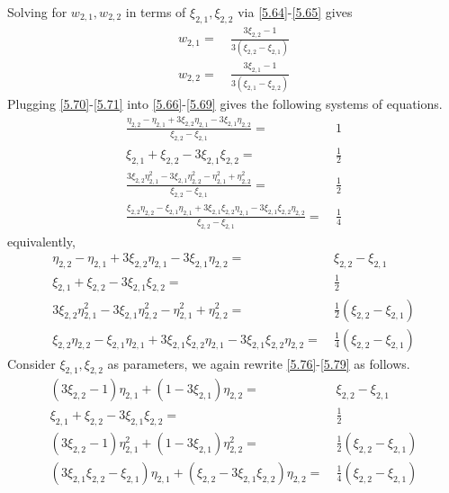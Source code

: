 \documentclass[a4paper]{article}
\numberwithin{equation}{section}
\begin{document}
Solving for $w_{2,1},w_{2,2}$ in terms of $\xi _{2,1},\xi _{2,2}$ via \eqref{5.64}-\eqref{5.65} gives
\begin{align}
\label{5.70}
{w_{2,1}} =&\ \frac{{3{\xi _{2,2}} - 1}}{{3\left( {{\xi _{2,2}} - {\xi _{2,1}}} \right)}}\\
{w_{2,2}} =&\ \frac{{3{\xi _{2,1}} - 1}}{{3\left( {{\xi _{2,1}} - {\xi _{2,2}}} \right)}} \label{5.71}
\end{align}
Plugging \eqref{5.70}-\eqref{5.71} into \eqref{5.66}-\eqref{5.69} gives the following systems of equations.
\begin{align}
\frac{{{\eta _{2,2}} - {\eta _{2,1}} + 3{\xi _{2,2}}{\eta _{2,1}} - 3{\xi _{2,1}}{\eta _{2,2}}}}{{{\xi _{2,2}} - {\xi _{2,1}}}} =&\ 1\\
{\xi _{2,1}} + {\xi _{2,2}} -3{\xi _{2,1}}{\xi _{2,2}}=&\ \frac{1}{2}\\
\frac{{3{\xi _{2,2}}\eta _{2,1}^2 - 3{\xi _{2,1}}\eta _{2,2}^2 - \eta _{2,1}^2 + \eta _{2,2}^2}}{{{\xi _{2,2}} - {\xi _{2,1}}}} =&\ \frac{1}{2}\\
\frac{{{\xi _{2,2}}{\eta _{2,2}} - {\xi _{2,1}}{\eta _{2,1}} + 3{\xi _{2,1}}{\xi _{2,2}}{\eta _{2,1}} - 3{\xi _{2,1}}{\xi _{2,2}}{\eta _{2,2}}}}{{{\xi _{2,2}} - {\xi _{2,1}}}} =&\ \frac{1}{4}
\end{align}
equivalently,
\begin{align}
\label{5.76}
{\eta _{2,2}} - {\eta _{2,1}} + 3{\xi _{2,2}}{\eta _{2,1}} - 3{\xi _{2,1}}{\eta _{2,2}} =&\ {\xi _{2,2}} - {\xi _{2,1}}\\
{\xi _{2,1}} + {\xi _{2,2}} -3{\xi _{2,1}}{\xi _{2,2}}=&\ \frac{1}{2}\\
3{\xi _{2,2}}\eta _{2,1}^2 - 3{\xi _{2,1}}\eta _{2,2}^2 - \eta _{2,1}^2 + \eta _{2,2}^2 =&\ \frac{1}{2}\left( {{\xi _{2,2}} - {\xi _{2,1}}} \right)\\
{\xi _{2,2}}{\eta _{2,2}} - {\xi _{2,1}}{\eta _{2,1}} + 3{\xi _{2,1}}{\xi _{2,2}}{\eta _{2,1}} - 3{\xi _{2,1}}{\xi _{2,2}}{\eta _{2,2}} =&\ \frac{1}{4}\left( {{\xi _{2,2}} - {\xi _{2,1}}} \right) \label{5.79}
\end{align}
Consider $\xi _{2,1},\xi _{2,2}$ as parameters, we again rewrite \eqref{5.76}-\eqref{5.79} as follows.
\begin{align}
\label{5.80}
\left( {3{\xi _{2,2}} - 1} \right){\eta _{2,1}} + \left( {1 - 3{\xi _{2,1}}} \right){\eta _{2,2}} =&\ {\xi _{2,2}} - {\xi _{2,1}}\\
{\xi _{2,1}} + {\xi _{2,2}} -3{\xi _{2,1}}{\xi _{2,2}}=&\ \frac{1}{2} \label{5.81}\\
\left( {3{\xi _{2,2}} - 1} \right)\eta _{2,1}^2 + \left( {1 - 3{\xi _{2,1}}} \right)\eta _{2,2}^2 =&\ \frac{1}{2}\left( {{\xi _{2,2}} - {\xi _{2,1}}} \right)\label{5.82}\\
\left( {3{\xi _{2,1}}{\xi _{2,2}} - {\xi _{2,1}}} \right){\eta _{2,1}} + \left( {{\xi _{2,2}} - 3{\xi _{2,1}}{\xi _{2,2}}} \right){\eta _{2,2}} =&\ \frac{1}{4}\left( {{\xi _{2,2}} - {\xi _{2,1}}} \right) \label{5.83}
\end{align}
\end{document}
